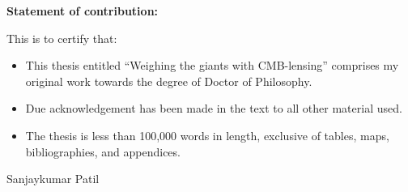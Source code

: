 


\bfseries{Statement of contribution:}\mdseries\\
\vspace{1.0cm}

This is to certify that:\\

\begin{itemize}

\item This thesis entitled ``Weighing the giants with CMB-lensing'' comprises my  original work towards the degree of Doctor of Philosophy.

\item Due acknowledgement has been made in the text to all other material used.

\item The thesis is less than 100,000 words in length, exclusive of tables, maps, bibliographies, and appendices.

\end{itemize}

\vspace{4.0cm}



Sanjaykumar Patil\\

